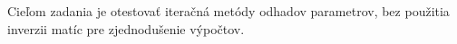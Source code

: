 Cieľom zadania je otestovať iteračná metódy odhadov parametrov, bez použitia inverzii matíc pre zjednodušenie výpočtov. 